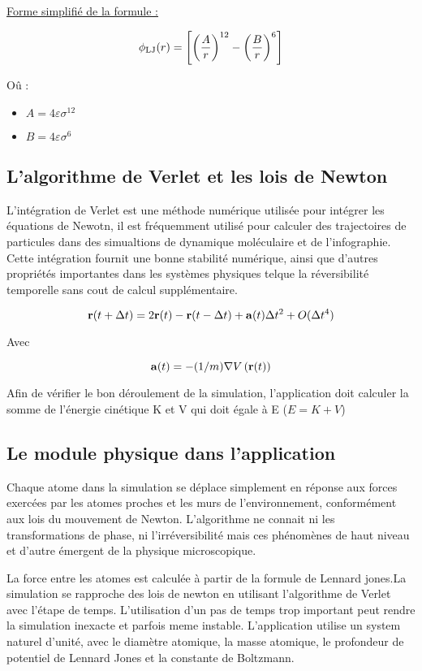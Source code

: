 \underline{Forme simplifié de la formule :}


 \begin{displaymath} 
 \phi_{\rm LJ} (r) =  \left[ \left(\frac{A}{r}\right)^{12} - \left(\frac{B}{r}\right)^{6} \right]\end{displaymath}

Oû : 
\begin{itemize}
    \item $ A = 4 \varepsilon \sigma ^{12}$
    \item $ B = 4 \varepsilon \sigma ^{6}$
\end{itemize}

\subsection{L'algorithme de Verlet et les lois de Newton}

L'intégration de Verlet est une méthode numérique utilisée pour intégrer les équations de Newotn, il est fréquemment utilisé pour calculer des trajectoires de particules dans des simualtions de dynamique moléculaire et de l'infographie.
Cette intégration fournit une bonne stabilité numérique, ainsi que d'autres propriétés importantes dans les systèmes physiques telque la réversibilité temporelle sans cout de calcul supplémentaire.

\begin{displaymath} {\bf r} (t+\Delta t) = 2{\bf r} (t) - {\bf r} (t-\Delta t) + {\bf a} (t) \Delta t^2 + O(\Delta t^4) \end{displaymath}

Avec 

\begin{displaymath} {\bf a} (t) = - (1/m) {\bf\nabla} V\left( {\bf r}(t) \right) \end{displaymath}

Afin de vérifier le bon déroulement de la simulation, l'application doit calculer la somme de l'énergie cinétique K et  V qui doit égale à E  ($ E = K + V $)
\subsection{Le module physique dans l'application}
Chaque atome dans la simulation se déplace simplement en réponse aux forces exercées par les atomes proches et les murs de l'environnement, conformément aux lois du mouvement de Newton. L'algorithme ne connait ni les transformations de phase, ni l'irréversibilité mais ces phénomènes de haut niveau et d'autre émergent de la physique microscopique.

La force entre les atomes est calculée à partir de la formule de Lennard jones.La simulation se rapproche des lois de newton en utilisant l'algorithme de Verlet avec l'étape de temps. L'utilisation d'un pas de temps trop important peut rendre la simulation inexacte et parfois meme instable.
L'application utilise un system naturel d'unité, avec le diamètre atomique, la masse atomique, le profondeur de potentiel de Lennard Jones et la constante de Boltzmann.
